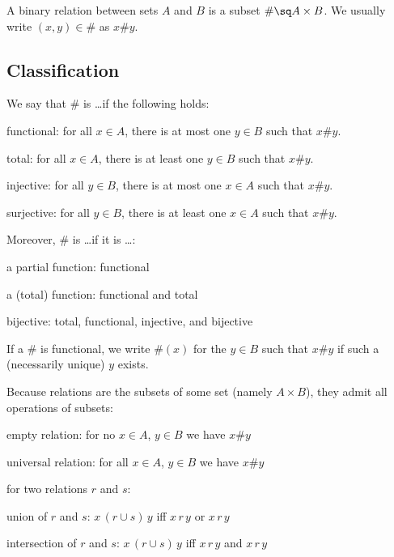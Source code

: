 A binary relation between sets $A$ and $B$ is a subset $\#\sq A\times B$.
We usually write $(x,y)\in\#$ as $x\# y$.

\subsection{Classification}

\begin{definition}\label{def:math:rel}
We say that $\#$ is \ldots if the following holds:
 \begin{compactitem}
 \item functional: for all $x\in A$, there is at most one $y\in B$ such that $x\# y$.
 \item total: for all $x\in A$, there is at least one $y\in B$ such that $x\# y$.
 \item injective: for all $y\in B$, there is at most one $x\in A$ such that $x\# y$.
 \item surjective: for all $y\in B$, there is at least one $x\in A$ such that $x\# y$.
 \end{compactitem}

Moreover, $\#$ is \ldots if it is \ldots:
 \begin{compactitem}
 \item a partial function: functional
 \item a (total) function: functional and total
 \item bijective: total, functional, injective, and bijective
 \end{compactitem}

If a $\#$ is functional, we write $\#(x)$ for the $y\in B$ such that $x\# y$ if such a (necessarily unique) $y$ exists.
\end{definition}

Because relations are the subsets of some set (namely $A\times B$), they admit all operations of subsets:
\begin{compactitem}
 \item empty relation: for no $x\in A$, $y\in B$ we have $x\# y$
 \item universal relation: for all $x\in A$, $y\in B$ we have $x\# y$
 \item for two relations $r$ and $s$:
  \begin{compactitem}
   \item union of $r$ and $s$: $x\,(r\cup s)\,y$ iff $x\,r\,y$ or $x\,r\,y$ 
   \item intersection of $r$ and $s$: $x\,(r\cup s)\,y$ iff $x\,r\,y$ and $x\,r\,y$
  \end{compactitem}
\end{compactitem}

